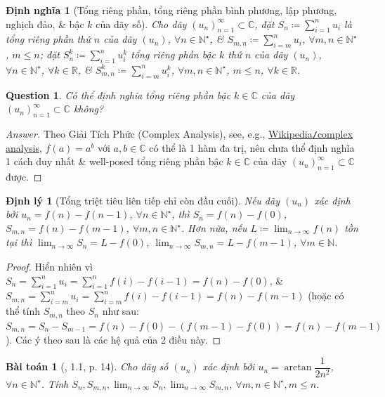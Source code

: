 \documentclass{article}
\newtheorem{baitoan}{Bài toán}
\newtheorem{dinhly}{Định lý}
\newtheorem{dinhnghia}{Định nghĩa}
\newtheorem{question}{Question}
\begin{document}
\begin{dinhnghia}[Tổng riêng phần, tổng riêng phần bình phương, lập phương, nghịch đảo, \& bậc $k$ của dãy số]
	Cho dãy $(u_n)_{n=1}^\infty\subset\mathbb{C}$, đặt $S_n\coloneqq\sum_{i=1}^n u_i$ là {\rm tổng riêng phần thứ $n$} của dãy $(u_n)$, $\forall n\in\mathbb{N}^\star$, \& $S_{m,n}\coloneqq\sum_{i=m}^n u_i$, $\forall m,n\in\mathbb{N}^\star$, $m\le n$; đặt $S_n^k\coloneqq\sum_{i=1}^n u_i^k$ {\rm tổng riêng phần bậc $k$ thứ $n$} của dãy $(u_n)$, $\forall n\in\mathbb{N}^\star$, $\forall k\in\mathbb{R}$, \& $S_{m,n}^k\coloneqq\sum_{i=m}^n u_i^k$, $\forall m,n\in\mathbb{N}^\star$, $m\le n$, $\forall k\in\mathbb{R}$.
\end{dinhnghia}

\begin{question}
	Có thể định nghĩa tổng riêng phần bậc $k\in\mathbb{C}$ của dãy $(u_n)_{n=1}^\infty\subset\mathbb{C}$ không?
\end{question}

\begin{proof}[Answer]
	Theo Giải Tích Phức (Complex Analysis), see, e.g., \href{https://en.wikipedia.org/wiki/Complex_analysis}{Wikipedia{\tt/}complex analysis}, $f(a) = a^b$ với $a,b\in\mathbb{C}$ có thể là 1 hàm đa trị, nên chưa thể định nghĩa 1 cách duy nhất \& well-posed tổng riêng phần bậc $k\in\mathbb{C}$ của dãy $(u_n)_{n=1}^\infty\subset\mathbb{C}$ được.
\end{proof}

\begin{dinhly}[Tổng triệt tiêu liên tiếp chỉ còn đầu cuối]
	\label{thm: eliminated sum}
	Nếu dãy $(u_n)$ xác định bởi $u_n = f(n) - f(n - 1)$, $\forall n\in\mathbb{N}^\star$, thì $S_n = f(n) - f(0)$, $S_{m,n} = f(n) - f(m - 1)$, $\forall m,n\in\mathbb{N}^\star$. Hơn nữa, nếu $L\coloneqq\lim_{n\to\infty} f(n)$ tồn tại thì $\lim_{n\to\infty} S_n = L - f(0)$, $\lim_{n\to\infty} S_{m,n} = L - f(m - 1)$, $\forall m\in\mathbb{N}$.
\end{dinhly}

\begin{proof}
	Hiển nhiên vì $S_n = \sum_{i=1}^n u_i = \sum_{i=1}^n f(i) - f(i - 1) = f(n) - f(0)$, \& $S_{m,n} = \sum_{i=m}^n u_i = \sum_{i=m}^n f(i) - f(i - 1) = f(n) - f(m - 1)$ (hoặc có thể tính $S_{m,n}$ theo $S_n$ như sau: $S_{m,n} = S_n - S_{m-1} = f(n) - f(0) - (f(m - 1) - f(0)) = f(n) - f(m - 1)$). Các ý theo sau là các hệ quả của 2 điều này.
\end{proof}

\begin{baitoan}[\cite{Quoc_Long_Dat_Nam_VMC}, 1.1, p. 14]
	Cho dãy số $(u_n)$ xác định bởi $u_n = \arctan\dfrac{1}{2n^2}$, $\forall n\in\mathbb{N}^\star$. Tính $S_n,S_{m,n},\lim_{n\to\infty} S_n,\lim_{n\to\infty} S_{m,n}$, $\forall m,n\in\mathbb{N}^\star,m\le n$.
\end{baitoan}
\end{document}
